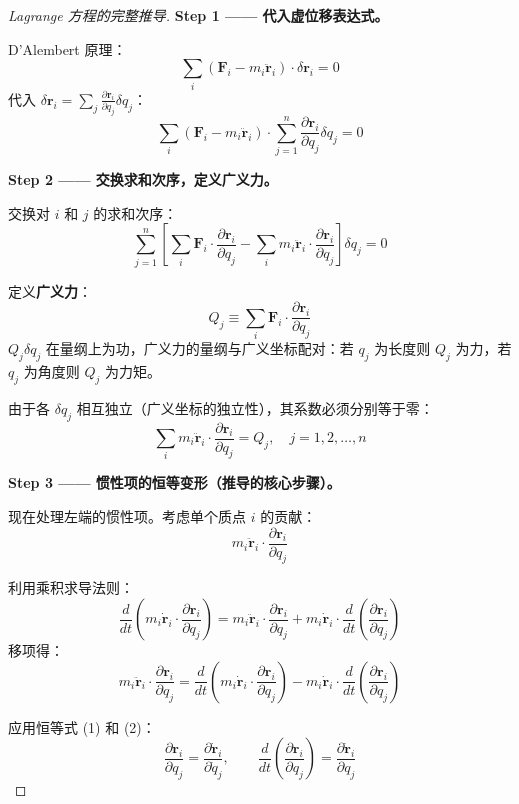 \begin{proof}[Lagrange 方程的完整推导]
	
	\textbf{Step 1 —— 代入虚位移表达式。}
	
	D'Alembert 原理：
	\[
	\sum_{i} \left( \mathbf{F}_i - m_i \ddot{\mathbf{r}}_i \right) \cdot \delta \mathbf{r}_i = 0
	\]
	代入 $\delta \mathbf{r}_i = \sum_{j} \frac{\partial \mathbf{r}_i}{\partial q_j} \delta q_j$：
	\[
	\sum_{i} \left( \mathbf{F}_i - m_i \ddot{\mathbf{r}}_i \right) \cdot \sum_{j=1}^{n} \frac{\partial \mathbf{r}_i}{\partial q_j} \delta q_j = 0
	\]
	
	\textbf{Step 2 —— 交换求和次序，定义广义力。}
	
	交换对 $i$ 和 $j$ 的求和次序：
	\[
	\sum_{j=1}^{n} \left[ \sum_{i} \mathbf{F}_i \cdot \frac{\partial \mathbf{r}_i}{\partial q_j} - \sum_{i} m_i \ddot{\mathbf{r}}_i \cdot \frac{\partial \mathbf{r}_i}{\partial q_j} \right] \delta q_j = 0
	\]
	
	定义\textbf{广义力}：
	\[
	Q_j \equiv \sum_{i} \mathbf{F}_i \cdot \frac{\partial \mathbf{r}_i}{\partial q_j}
	\tag{3}
	\]
	$Q_j \delta q_j$ 在量纲上为功，广义力的量纲与广义坐标配对：若 $q_j$ 为长度则 $Q_j$ 为力，若 $q_j$ 为角度则 $Q_j$ 为力矩。
	
	由于各 $\delta q_j$ 相互独立（广义坐标的独立性），其系数必须分别等于零：
	\[
	\sum_{i} m_i \ddot{\mathbf{r}}_i \cdot \frac{\partial \mathbf{r}_i}{\partial q_j} = Q_j, \quad j = 1, 2, \ldots, n
	\tag{4}
	\]
	
	\textbf{Step 3 —— 惯性项的恒等变形（推导的核心步骤）。}
	
	现在处理左端的惯性项。考虑单个质点 $i$ 的贡献：
	\[
	m_i \ddot{\mathbf{r}}_i \cdot \frac{\partial \mathbf{r}_i}{\partial q_j}
	\]
	
	利用乘积求导法则：
	\[
	\frac{d}{dt} \left( m_i \dot{\mathbf{r}}_i \cdot \frac{\partial \mathbf{r}_i}{\partial q_j} \right) = m_i \ddot{\mathbf{r}}_i \cdot \frac{\partial \mathbf{r}_i}{\partial q_j} + m_i \dot{\mathbf{r}}_i \cdot \frac{d}{dt} \left( \frac{\partial \mathbf{r}_i}{\partial q_j} \right)
	\]
	移项得：
	\[
	m_i \ddot{\mathbf{r}}_i \cdot \frac{\partial \mathbf{r}_i}{\partial q_j} = \frac{d}{dt} \left( m_i \dot{\mathbf{r}}_i \cdot \frac{\partial \mathbf{r}_i}{\partial q_j} \right) - m_i \dot{\mathbf{r}}_i \cdot \frac{d}{dt} \left( \frac{\partial \mathbf{r}_i}{\partial q_j} \right)
	\tag{5}
	\]
	
	应用恒等式 (1) 和 (2)：
	\[
	\frac{\partial \mathbf{r}_i}{\partial q_j} = \frac{\partial \dot{\mathbf{r}}_i}{\partial \dot{q}_j}, \qquad
	\frac{d}{dt} \left( \frac{\partial \mathbf{r}_i}{\partial q_j} \right) = \frac{\partial \dot{\mathbf{r}}_i}{\partial q_j}
	\]
	

\end{proof}
